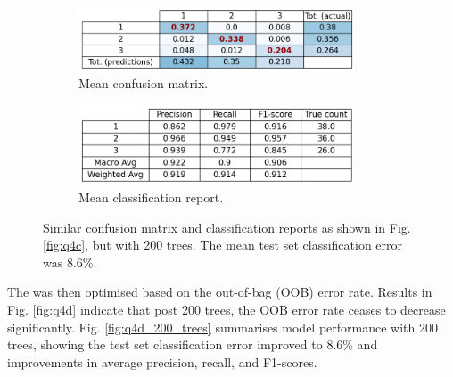     \begin{figure}[htb]
    \centering
    \begin{subfigure}{0.5\textwidth}
        \centering
        \includegraphics[width=0.9\textwidth]{./figures/q4d_confusion_matrix_200_trees}
        \caption{Mean confusion matrix.}
        \label{fig:q4d_confusion_matrix_200_trees}
    \end{subfigure}%
    \begin{subfigure}{0.5\textwidth}
        \centering
        \includegraphics[width=0.9\textwidth]{./figures/q4d_classification_report_200_trees}
        \caption{Mean classification report.}
        \label{fig:q4d_classification_report_200_trees}
    \end{subfigure}
    \caption{Similar confusion matrix and classification reports as shown in Fig. \eqref{fig:q4c}, but with 200 trees.
        The mean test set classification error was 8.6\%.}
    \label{fig:q4d_200_trees}
    \end{figure}

    The  was then optimised based on the out-of-bag (OOB) error rate.
    Results in Fig. \eqref{fig:q4d} indicate that post 200 trees, the OOB error rate ceases to decrease significantly.
    Fig. \eqref{fig:q4d_200_trees} summarises model performance with 200 trees, showing the test set classification error
    improved to 8.6\% and improvements in average precision, recall, and F1-scores.

